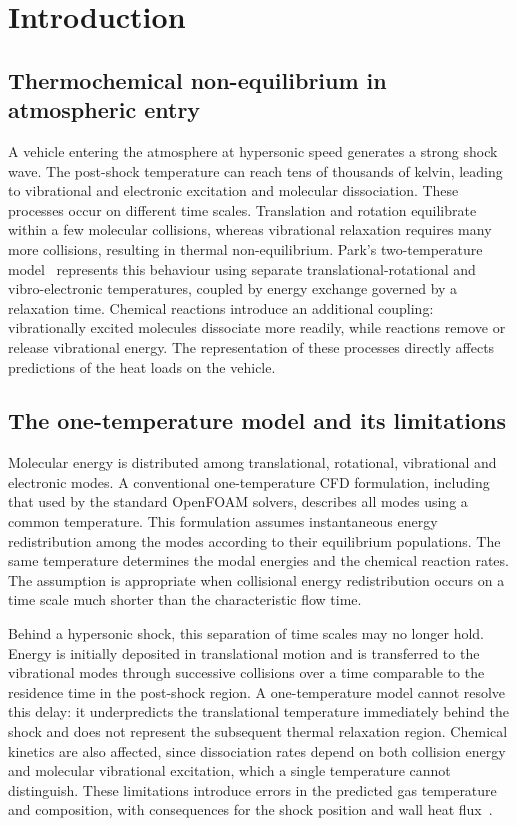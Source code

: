 \section{Introduction}
\label{sec:introduzione}

\subsection{Thermochemical non-equilibrium in atmospheric entry}
\label{sec:contesto}

A vehicle entering the atmosphere at hypersonic speed generates a strong shock
wave. The post-shock temperature can reach tens of thousands of kelvin,
leading to vibrational and electronic excitation and molecular dissociation.
These processes occur on different time scales. Translation and rotation
equilibrate within a few molecular collisions, whereas vibrational relaxation
requires many more collisions, resulting in thermal non-equilibrium.
Park's two-temperature model~\cite{park1990,park1993} represents this behaviour
using separate translational-rotational and vibro-electronic temperatures,
coupled by energy exchange governed by a relaxation time. Chemical reactions
introduce an additional coupling: vibrationally excited molecules dissociate
more readily, while reactions remove or release vibrational energy. The
representation of these processes directly affects predictions of the heat
loads on the vehicle.

\subsection{The one-temperature model and its limitations}
\label{sec:una-temperatura}

Molecular energy is distributed among translational, rotational, vibrational
and electronic modes. A conventional one-temperature CFD formulation,
including that used by the standard OpenFOAM solvers, describes all modes
using a common temperature. This formulation assumes instantaneous energy
redistribution among the modes according to their equilibrium populations.
The same temperature determines the modal energies and the chemical reaction
rates. The assumption is appropriate when collisional energy redistribution
occurs on a time scale much shorter than the characteristic flow time.

Behind a hypersonic shock, this separation of time scales may no longer hold.
Energy is initially deposited in translational motion and is transferred to
the vibrational modes through successive collisions over a time comparable to
the residence time in the post-shock region. A one-temperature model cannot
resolve this delay: it underpredicts the translational temperature immediately
behind the shock and does not represent the subsequent thermal relaxation
region. Chemical kinetics are also affected, since dissociation rates depend
on both collision energy and molecular vibrational excitation, which a single
temperature cannot distinguish. These limitations introduce errors in the
predicted gas temperature and composition, with consequences for the shock
position and wall heat flux~\cite{park1990}.

